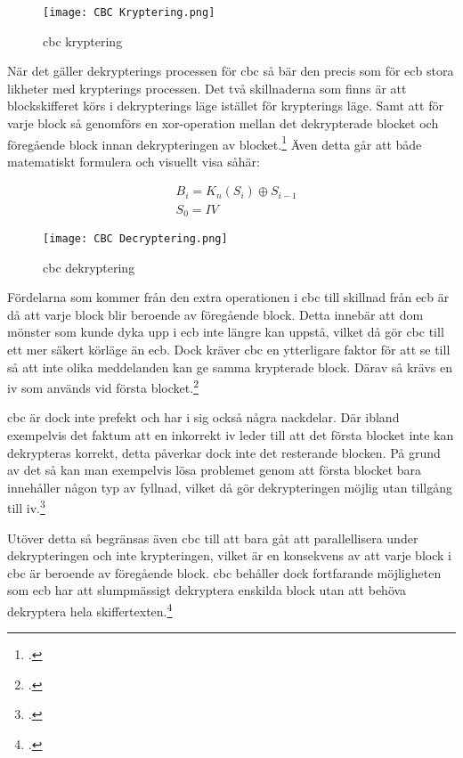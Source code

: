 \begin{figure}[H]
    \texttt{[image: CBC Kryptering.png]}
    \caption{\acrlong{cbc} kryptering}
    \label{fig:cbc-mode-enc}
\end{figure}

När det gäller dekrypterings processen för \acrshort{cbc} så bär den precis som för
\acrshort{ecb} stora likheter med krypterings processen. Det två skillnaderna som
finns är att blockskifferet körs i dekrypterings läge istället för krypterings läge.
Samt att för varje block så genomförs en \gls{xor}-operation mellan det dekrypterade
blocket och föregående block innan dekrypteringen av blocket.\footcite{dworkin2001sp}
Även detta går att både matematiskt formulera och visuellt visa såhär:

\begin{equation}
    \label{eq:cbc-decryption}
    \begin{aligned}
        &B_i = K_n(S_i) \oplus S_{i-1}\\\nonumber
        &S_0 = IV
    \end{aligned}
\end{equation}

\begin{figure}[H]
    \texttt{[image: CBC Decryptering.png]}
    \caption{\acrlong{cbc} dekryptering}
    \label{fig:cbc-mode-dec}
\end{figure}

Fördelarna som kommer från den extra operationen i \acrshort{cbc} till skillnad
från \acrshort{ecb} är då att varje block blir beroende av föregående block.
Detta innebär att dom mönster som kunde dyka upp i \acrshort{ecb} inte längre
kan uppstå, vilket då gör \acrshort{cbc} till ett mer säkert körläge än \acrshort{ecb}.
Dock kräver \acrshort{cbc} en ytterligare faktor för att se till så att inte olika meddelanden
kan ge samma krypterade block. Därav så krävs en \acrfull{iv} som används vid första
blocket.\footcite{dworkin2001sp}

\acrshort{cbc} är dock inte prefekt och har i sig också några nackdelar. Där ibland
exempelvis det faktum att en inkorrekt \acrshort{iv} leder till att det första blocket
inte kan dekrypteras korrekt, detta påverkar dock inte det resterande blocken. På grund
av det så kan man exempelvis lösa problemet genom att första blocket bara innehåller
någon typ av fyllnad, vilket då gör dekrypteringen möjlig utan tillgång till \acrshort{iv}.\footcite{dworkin2001sp}

Utöver detta så begränsas även \acrshort{cbc} till att bara gåt att parallellisera under
dekrypteringen och inte krypteringen, vilket är en konsekvens av att varje block i \acrshort{cbc}
är beroende av föregående block. \acrshort{cbc} behåller dock fortfarande möjligheten
som \acrshort{ecb} har att slumpmässigt dekryptera enskilda block utan att behöva
dekryptera hela skiffertexten.\footcite{dworkin2001sp}

